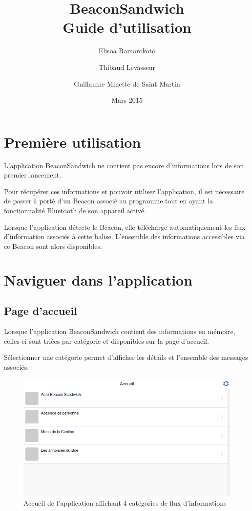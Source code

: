 \documentclass{report}
\title{\textbf{BeaconSandwich} \\ Guide d'utilisation}
\author{Elisoa Ramarokoto \and Thibaud Levasseur \and Guillaume Minette de Saint Martin }
\date{Mars 2015}
\begin{document}
\maketitle
\tableofcontents

\chapter{Première utilisation}

L'application BeaconSandwich ne contient pas encore d'informations lors de son premier lancement.

Pour récupérer ces informations et pouvoir utiliser l'application, il est nécessaire de passer à porté d'un Beacon associé au programme tout en ayant la fonctionnalité Bluetooth de son appareil activé. 

Lorsque l'application détecte le Beacon, elle télécharge automatiquement les flux d'information associés à cette balise. L'ensemble des informations accessibles via ce Beacon sont alors disponibles.

\chapter{Naviguer dans l'application}

\section{Page d'accueil}

Lorsque l'application BeaconSandwich contient des informations en mémoire, celles-ci sont triées par catégorie et disponibles sur la page d'accueil.

Sélectionner une catégorie permet d'afficher les détails et l'ensemble des messages associés.

\begin{figure}[h]
	\centering
	\includegraphics[scale=0.28]{menu.png}
	\caption{Accueil de l'application affichant 4 catégories de flux d'informations}
\end{figure}
\end{document}
